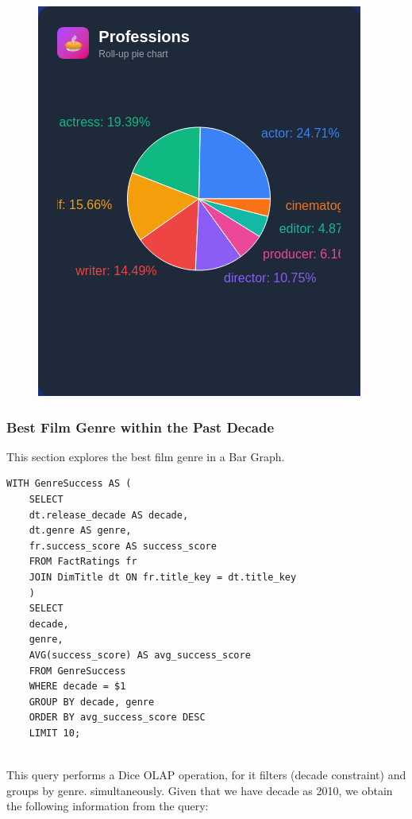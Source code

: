 \begin{figure}[h!]
	\centering
	\includegraphics[width=0.7\linewidth]{images/image2.png}
	\caption{}
\end{figure}

\subsubsection{Best Film Genre within the Past Decade}

This section explores the best film genre in a Bar Graph.
\begin{lstlisting}[style=SQLStyle]
	WITH GenreSuccess AS (
	SELECT
	dt.release_decade AS decade,
	dt.genre AS genre,
	fr.success_score AS success_score
	FROM FactRatings fr
	JOIN DimTitle dt ON fr.title_key = dt.title_key
	)
	SELECT 
	decade, 
	genre, 
	AVG(success_score) AS avg_success_score
	FROM GenreSuccess
	WHERE decade = $1
	GROUP BY decade, genre
	ORDER BY avg_success_score DESC
	LIMIT 10;
	
\end{lstlisting}

This query performs a Dice OLAP operation, for it filters (decade constraint) and groups by genre. simultaneously. Given that we have decade as 2010, we obtain the following information from the query:

